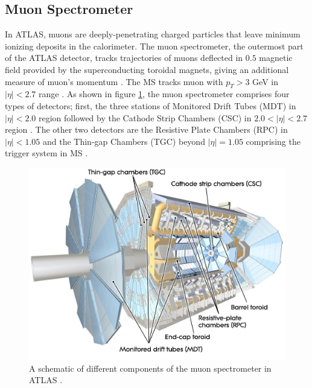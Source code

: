 \subsection{Muon Spectrometer}
\label{subsec:MS}
In ATLAS, muons are deeply-penetrating charged particles that leave minimum ionizing deposits in the calorimeter. The muon spectrometer, the outermost part of the ATLAS detector, tracks trajectories of muons deflected in $0.5$ magnetic field provided by the superconducting toroidal magnets, giving an additional measure of muon's momentum \cite{ATLAS}. The MS tracks muon with $p_{T} > 3$ GeV in $|\eta| < 2.7$ range \cite{ATLAS}. As shown in figure \ref{fig:ATLAS_MS}, the muon spectrometer comprises four types of detectors; first, the three stations of Monitored Drift Tubes (MDT) in $|\eta| < 2.0$ region followed by the Cathode Strip Chambers (CSC) in  $2.0 < |\eta| < 2.7$ region \cite{ATLAS}. The other two detectors are the Resistive Plate Chambers (RPC) in $|\eta| < 1.05$ and the Thin-gap Chambers (TGC) beyond $|\eta| = 1.05$ comprising the trigger system in MS \cite{ATLAS}. 

\begin{figure}
    \centering
    \includegraphics[width=.98\linewidth]{figures/LHC/ATLAS_MS.jpeg}
    \caption{ A schematic of different components of the muon spectrometer in ATLAS \cite{ATLAS}.\label{fig:ATLAS_MS}}
\end{figure}